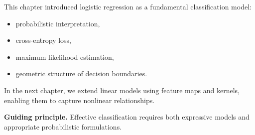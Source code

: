 This chapter introduced logistic regression as a fundamental classification model:
\begin{itemize}
    \item probabilistic interpretation,
    \item cross-entropy loss,
    \item maximum likelihood estimation,
    \item geometric structure of decision boundaries.
\end{itemize}

\medskip

In the next chapter, we extend linear models using feature maps and kernels, enabling them to capture nonlinear relationships.

\medskip

\noindent
\textbf{Guiding principle.}  
Effective classification requires both expressive models and appropriate probabilistic formulations.